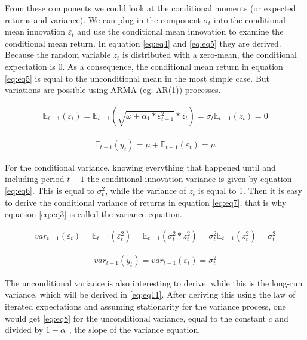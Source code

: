 \documentclass[a4paper, twoside]{templates/ociamthesis}
\begin{document}
\noindent From these components we could look at the conditional moments (or expected returns and variance). We can plug in the component \(\sigma_t\) into the conditional mean innovation \(\varepsilon_{t}\) and use the conditional mean innovation to examine the conditional mean return. In equation \eqref{eq:eq4} and \eqref{eq:eq5} they are derived. Because the random variable \(z_t\) is distributed with a zero-mean, the conditional expectation is 0. As a consequence, the conditional mean return in equation \eqref{eq:eq5} is equal to the unconditional mean in the most simple case. But variations are possible using ARMA (eg. AR(1)) processes.

\begin{align} 
\mathbb{E}_{t-1}(\varepsilon_{t}) = \mathbb{E}_{t-1}(\sqrt{\omega + \alpha_1 *  \varepsilon_{t-1}^2} * z_t) = \sigma_t\mathbb{E}_{t-1}(z_t) = 0
 \label{eq:eq4}
\end{align} 

\begin{align} 
\mathbb{E}_{t-1}(y_{t}) = \mu + \mathbb{E}_{t-1}(\varepsilon_{t}) = \mu
 \label{eq:eq5}
\end{align}

\noindent For the conditional variance, knowing everything that happened until and including period \(t-1\) the conditional innovation variance is given by equation \eqref{eq:eq6}. This is equal to \(\sigma_t^2\), while the variance of \(z_t\) is equal to 1. Then it is easy to derive the conditional variance of returns in equation \eqref{eq:eq7}, that is why equation \eqref{eq:eq3} is called the variance equation.

\begin{align} 
var_{t-1}(\varepsilon_t) = \mathbb{E}_{t-1}(\varepsilon_{t}^2) = \mathbb{E}_{t-1}(\sigma_t^2 * z_t^2) = \sigma_t^2\mathbb{E}_{t-1}(z_t^2) = \sigma_t^2
 \label{eq:eq6}
\end{align} 

\begin{align} 
var_{t-1}(y_t) = var_{t-1}(\varepsilon_t)= \sigma_t^2
 \label{eq:eq7}
\end{align}

\noindent The unconditional variance is also interesting to derive, while this is the long-run variance, which will be derived in \eqref{eq:eq11}. After deriving this using the law of iterated expectations and assuming stationarity for the variance process, one would get \eqref{eq:eq8} for the unconditional variance, equal to the constant \(c\) and divided by \(1-\alpha_1\), the slope of the variance equation.
\end{document}

